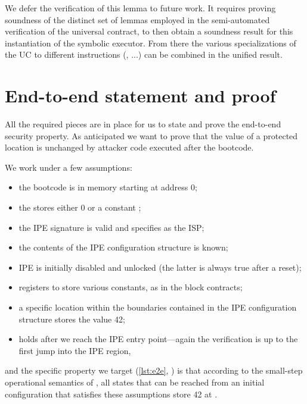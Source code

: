 We defer the verification of this lemma to future work. It requires proving soundness of the distinct set of lemmas employed in the semi-automated verification of the universal contract, to then obtain a soundness result for this instantiation of the symbolic executor. From there the various specializations of the UC to different instructions (, ...) can be combined in the unified  result.

\section{End-to-end statement and proof}

All the required pieces are in place for us to state and prove the end-to-end security property. As anticipated we want to prove that the value of a protected location is unchanged by attacker code executed after the bootcode.

We work under a few assumptions:
\begin{itemize}
\item the bootcode is in memory starting at address 0;
\item the  stores either 0 or a constant ;
\item the IPE signature is valid and specifies  as the ISP;
\item the contents of the IPE configuration structure is known;
\item IPE is initially disabled and unlocked (the latter is always true after a reset);
\item registers  to  store various constants, as in the block contracts;
\item a specific location  within the boundaries contained in the IPE configuration structure stores the value 42;
\item {} holds after we reach the IPE entry point---again the verification is up to the first jump into the IPE region,
\end{itemize}
and the specific property we target (\cref{lst:e2e}, ) is that according to the small-step operational semantics of \usail, all states that can be reached from an initial configuration that satisfies these assumptions store 42 at .

